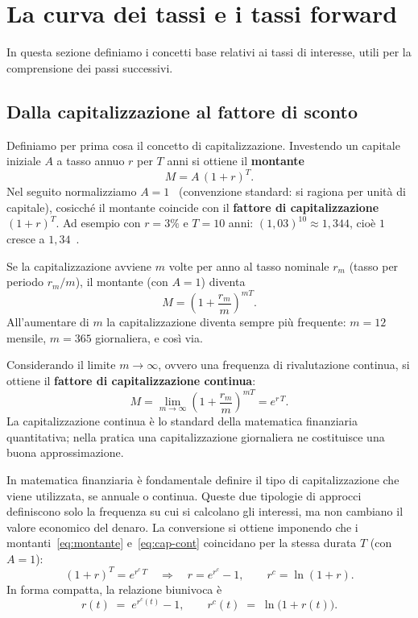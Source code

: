 \documentclass[11pt,a4paper]{article}
\theoremstyle{plain}
\theoremstyle{definition}
\theoremstyle{remark}
\begin{document}
\section{La curva dei tassi e i tassi forward}

In questa sezione definiamo i concetti base relativi ai tassi di interesse, utili per la comprensione dei passi successivi.

\subsection{Dalla capitalizzazione al fattore di sconto}

Definiamo per prima cosa il concetto di capitalizzazione.
Investendo un capitale iniziale $A$ a tasso annuo $r$ per $T$ anni si ottiene il
\textbf{montante}
\begin{equation}
  M = A\,(1+r)^T.
  \label{eq:montante}
\end{equation}
Nel seguito normalizziamo $A = 1$~\texteuro{} (convenzione standard: si ragiona per
unit\`a di capitale), cosicch\'e il montante coincide con il \textbf{fattore di
capitalizzazione} $(1+r)^T$. Ad esempio con $r=3\%$ e $T=10$ anni:
$(1{,}03)^{10} \approx 1{,}344$, cio\`e $1$~\texteuro{} cresce a $1{,}34$~\texteuro{}.

Se la capitalizzazione avviene $m$ volte per anno al tasso nominale $r_m$ (tasso per
periodo $r_m/m$), il montante (con $A=1$) diventa
\[
  M = \left(1 + \frac{r_m}{m}\right)^{mT}.
\]
All'aumentare di $m$ la capitalizzazione diventa sempre pi\`u frequente: $m=12$ mensile,
$m=365$ giornaliera, e cos\`i via.

Considerando il limite ${m\to\infty}$, ovvero una frequenza di rivalutazione continua, si
ottiene il \textbf{fattore di capitalizzazione continua}:
\begin{equation}
  M = \lim_{m\to\infty}\left(1+\frac{r_m}{m}\right)^{mT} = e^{r\,T}.
  \label{eq:cap-cont}
\end{equation}
La capitalizzazione continua \`e lo standard della matematica finanziaria quantitativa; nella
pratica una capitalizzazione giornaliera ne costituisce una buona approssimazione.

In matematica finanziaria è fondamentale definire il tipo di capitalizzazione che viene utilizzata, 
se annuale o continua. Queste due tipologie di approcci definiscono solo la frequenza su cui si calcolano gli interessi,
ma non cambiano il valore economico del denaro.  La conversione si ottiene imponendo che i montanti~\eqref{eq:montante}
e~\eqref{eq:cap-cont} coincidano per la stessa durata $T$ (con $A=1$):
\[
  (1+r)^T = e^{r^c\,T}
  \quad\Longrightarrow\quad
  r = e^{r^c} - 1,\qquad r^c = \ln(1+r).
\]
In forma compatta, la relazione biunivoca \`e
\begin{equation}
  r(t) \;=\; e^{r^c(t)} - 1,
  \qquad
  r^c(t) \;=\; \ln\!\bigl(1 + r(t)\bigr).
  \label{eq:conv-ann-cont}
\end{equation}
\end{document}
